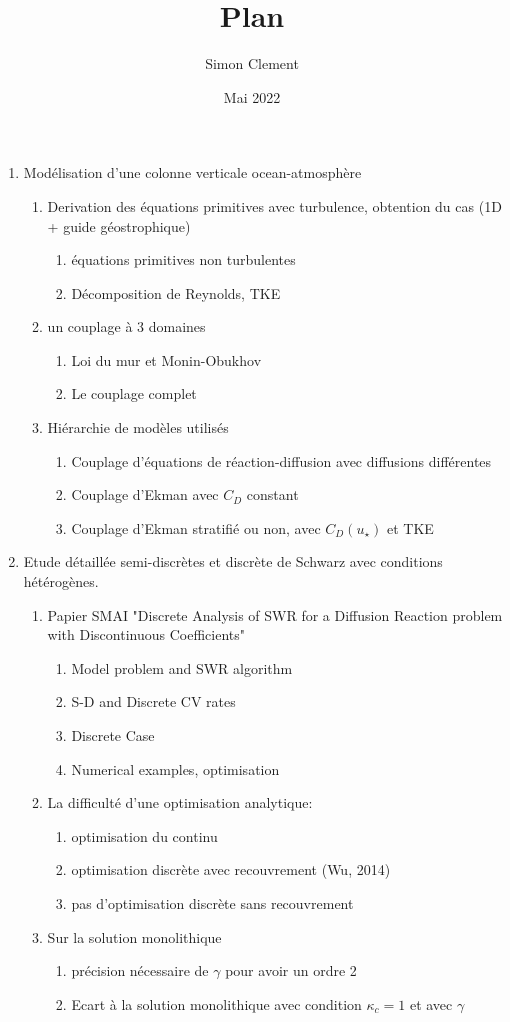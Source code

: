 \documentclass{article}
\title{Plan}
\author{Simon Clement}
\date{Mai 2022}
\begin{document}
\begin{enumerate}
\item Modélisation d'une colonne verticale ocean-atmosphère
\begin{enumerate}
	\item Derivation des équations primitives avec turbulence,
		obtention du cas (1D + guide géostrophique)
		\begin{enumerate}
			\item équations primitives non turbulentes
			\item Décomposition de Reynolds, TKE
		\end{enumerate}
	\item un couplage à 3 domaines
		\begin{enumerate}
			\item Loi du mur et Monin-Obukhov
			\item Le couplage complet
		\end{enumerate}
	\item Hiérarchie de modèles utilisés
		\begin{enumerate}
			\item Couplage d'équations de
				réaction-diffusion avec
				diffusions différentes
			\item Couplage d'Ekman avec $C_D$ constant
			\item Couplage d'Ekman stratifié ou non,
				avec $C_D(u_\star)$ et TKE
		\end{enumerate}
\end{enumerate}
\item Etude détaillée semi-discrètes et discrète de Schwarz avec
	conditions hétérogènes.
	\begin{enumerate}
		\item Papier SMAI "Discrete Analysis of SWR for a Diffusion
			Reaction problem with Discontinuous Coefficients"
			\begin{enumerate}
				\item Model problem and SWR algorithm
				\item S-D and Discrete CV rates
				\item Discrete Case
				\item Numerical examples, optimisation
			\end{enumerate}
		\item La difficulté d'une optimisation analytique:
			\begin{enumerate}
				\item optimisation du continu
				\item optimisation discrète avec
					recouvrement (Wu, 2014)
				\item pas d'optimisation discrète sans
					recouvrement
			\end{enumerate}
		\item Sur la solution monolithique
			\begin{enumerate}
				\item précision nécessaire de
					$\gamma$ pour avoir un ordre 2
				\item Ecart à la solution monolithique
					avec condition $\kappa_c=1$
					et avec $\gamma$
			\end{enumerate}


\end{enumerate}
\end{enumerate}
\end{document}
